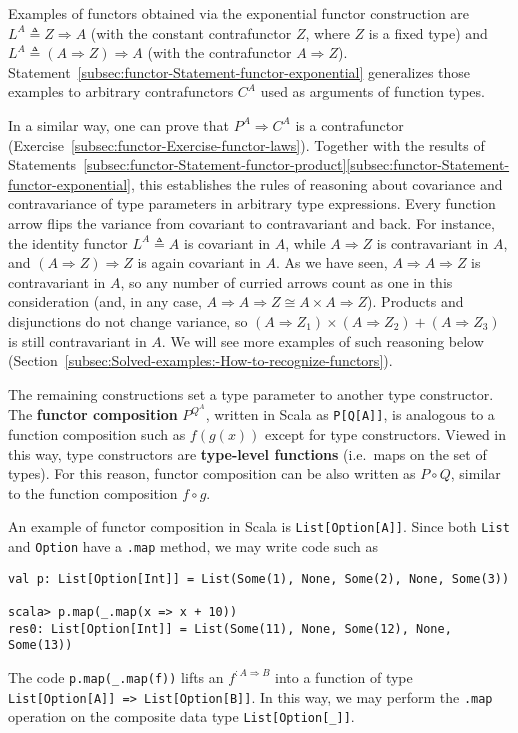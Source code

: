 Examples of functors obtained via the exponential
functor construction are $L^{A}\triangleq Z\Rightarrow A$ (with the
constant contrafunctor $Z$, where $Z$ is a fixed type) and $L^{A}\triangleq\left(A\Rightarrow Z\right)\Rightarrow A$
(with the contrafunctor $A\Rightarrow Z$). Statement~\ref{subsec:functor-Statement-functor-exponential}
generalizes those examples to arbitrary contrafunctors $C^{A}$ used
as arguments of function types.

In a similar way, one can prove that $P^{A}\Rightarrow C^{A}$ is
a contrafunctor (Exercise~\ref{subsec:functor-Exercise-functor-laws}).
Together with the results of Statements~\ref{subsec:functor-Statement-functor-product}\textendash \ref{subsec:functor-Statement-functor-exponential},
this establishes the rules of reasoning about covariance and contravariance
of type parameters in arbitrary type expressions. Every function arrow
flips the variance from covariant to contravariant and back. For instance,
the identity functor $L^{A}\triangleq A$ is covariant in $A$, while
$A\Rightarrow Z$ is contravariant in $A$, and $\left(A\Rightarrow Z\right)\Rightarrow Z$
is again covariant in $A$. As we have seen, $A\Rightarrow A\Rightarrow Z$
is contravariant in $A$, so any number of curried arrows count as
one in this consideration (and, in any case, $A\Rightarrow A\Rightarrow Z\cong A\times A\Rightarrow Z$).
Products and disjunctions do not change variance, so $\left(A\Rightarrow Z_{1}\right)\times\left(A\Rightarrow Z_{2}\right)+\left(A\Rightarrow Z_{3}\right)$
is still contravariant in $A$. We will see more examples of such
reasoning below (Section~\ref{subsec:Solved-examples:-How-to-recognize-functors}).

The remaining constructions set a type parameter to another type constructor.
The \textbf{functor composition} $P^{Q^{A}}$,
written in Scala as \lstinline!P[Q[A]]!, is analogous to a function
composition such as $f(g(x))$ except for type constructors. Viewed
in this way, type constructors are \textbf{type-level functions}
(i.e.~maps on the set of types). For this reason, functor composition
can be also written as $P\circ Q$, similar to the function composition
$f\circ g$.

An example of functor composition in Scala is \lstinline!List[Option[A]]!.
Since both \lstinline!List! and \lstinline!Option! have a \lstinline!.map!
method, we may write code such as
\begin{lstlisting}
val p: List[Option[Int]] = List(Some(1), None, Some(2), None, Some(3))

scala> p.map(_.map(x => x + 10))
res0: List[Option[Int]] = List(Some(11), None, Some(12), None, Some(13)) 
\end{lstlisting}
The code \lstinline!p.map(_.map(f))! lifts an $f^{:A\Rightarrow B}$
into a function of type \lstinline!List[Option[A]] => List[Option[B]]!.
In this way, we may perform the \lstinline!.map! operation on the
composite data type \lstinline!List[Option[_]]!. 


